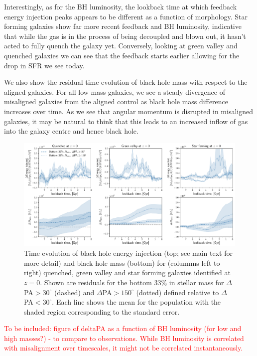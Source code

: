 \documentclass[fleqn,usenatbib]{mnras}
\newcommand{\red}[1]{{\textcolor{red}{#1}}}
\begin{document}
Interestingly, as for the BH luminosity, the lookback time at which feedback energy injection peaks appears to be different as a function of morphology. Star forming galaxies show far more recent feedback and BH luminosity, indicative that while the gas is in the process of being decoupled and blown out, it hasn't acted to fully quench the galaxy yet. Conversely, looking at green valley and quenched galaxies we can see that the feedback starts earlier allowing for the drop in SFR we see today.

We also show the residual time evolution of black hole mass with respect to the aligned galaxies. For all low mass galaxies, we see a steady divergence of misaligned galaxies from the aligned control as black hole mass difference increases over time. As we see that angular momentum is disrupted in misaligned galaxies, it may be natural to think that this leads to an increased inflow of gas into the galaxy centre and hence black hole.

\begin{figure}
	\includegraphics[width=0.9\linewidth]{overall_population/LM_BH_residual_evo.pdf}
    \caption{Time evolution of black hole energy injection (top; see main text for more detail) and black hole mass (bottom) for (columnns left to right) quenched, green valley and star forming galaxies identified at $z=0$. Shown are residuals for the bottom 33\% in stellar mass for $\Delta$PA$ > 30^{\circ}$ (dashed) and $\Delta$PA$ > 150^{\circ}$ (dotted) defined relative to $\Delta$PA$ < 30^{\circ}$. Each line shows the mean for the population with the shaded region corresponding to the standard error.}
    \label{fig:LM_BH}
\end{figure}

\red{To be included: figure of deltaPA as a function of BH luminosity (for low and high masses?) - to compare to observations. While BH luminosity is correlated with misalignment over timescales, it might not be correlated instantaneously.}
\end{document}
